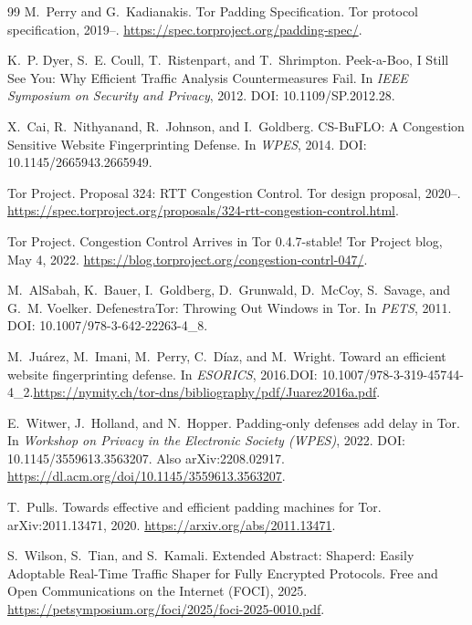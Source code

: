 \documentclass[11pt]{article}
\theoremstyle{definition}
\theoremstyle{remark}
\begin{document}
\begin{thebibliography}{99}
M.~Perry and G.~Kadianakis.
\newblock Tor Padding Specification.
\newblock Tor protocol specification, 2019--.
\newblock \url{https://spec.torproject.org/padding-spec/}.

K.~P. Dyer, S.~E. Coull, T.~Ristenpart, and T.~Shrimpton.
\newblock Peek-a-Boo, I Still See You: Why Efficient Traffic Analysis Countermeasures Fail.
\newblock In \emph{IEEE Symposium on Security and Privacy}, 2012.
\newblock DOI: 10.1109/SP.2012.28.

X.~Cai, R.~Nithyanand, R.~Johnson, and I.~Goldberg.
\newblock CS-BuFLO: A Congestion Sensitive Website Fingerprinting Defense.
\newblock In \emph{WPES}, 2014.
\newblock DOI: 10.1145/2665943.2665949.

Tor Project.
\newblock Proposal 324: RTT Congestion Control.
\newblock Tor design proposal, 2020--.
\newblock \url{https://spec.torproject.org/proposals/324-rtt-congestion-control.html}.

Tor Project.
\newblock Congestion Control Arrives in Tor 0.4.7-stable!
\newblock Tor Project blog, May 4, 2022.
\newblock \url{https://blog.torproject.org/congestion-contrl-047/}.

M.~AlSabah, K.~Bauer, I.~Goldberg, D.~Grunwald, D.~McCoy, S.~Savage, and G.~M. Voelker.
\newblock DefenestraTor: Throwing Out Windows in Tor.
\newblock In \emph{PETS}, 2011.
\newblock DOI: 10.1007/978-3-642-22263-4\_8.

M.~Ju\'arez, M.~Imani, M.~Perry, C.~D\'iaz, and M.~Wright.
\newblock Toward an efficient website fingerprinting defense.
\newblock In \emph{ESORICS}, 2016.\newblock DOI: 10.1007/978-3-319-45744-4\_2.\newblock \url{https://nymity.ch/tor-dns/bibliography/pdf/Juarez2016a.pdf}.

E.~Witwer, J.~Holland, and N.~Hopper.
\newblock Padding-only defenses add delay in Tor.
\newblock In \emph{Workshop on Privacy in the Electronic Society (WPES)}, 2022.
\newblock DOI: 10.1145/3559613.3563207. Also arXiv:2208.02917.
\newblock \url{https://dl.acm.org/doi/10.1145/3559613.3563207}.

T.~Pulls.
\newblock Towards effective and efficient padding machines for Tor.
\newblock arXiv:2011.13471, 2020.
\newblock \url{https://arxiv.org/abs/2011.13471}.

S.~Wilson, S.~Tian, and S.~Kamali.
\newblock Extended Abstract: Shaperd: Easily Adoptable Real-Time Traffic Shaper for Fully Encrypted Protocols.
\newblock Free and Open Communications on the Internet (FOCI), 2025.
\newblock \url{https://petsymposium.org/foci/2025/foci-2025-0010.pdf}.


\end{thebibliography}
\end{document}
